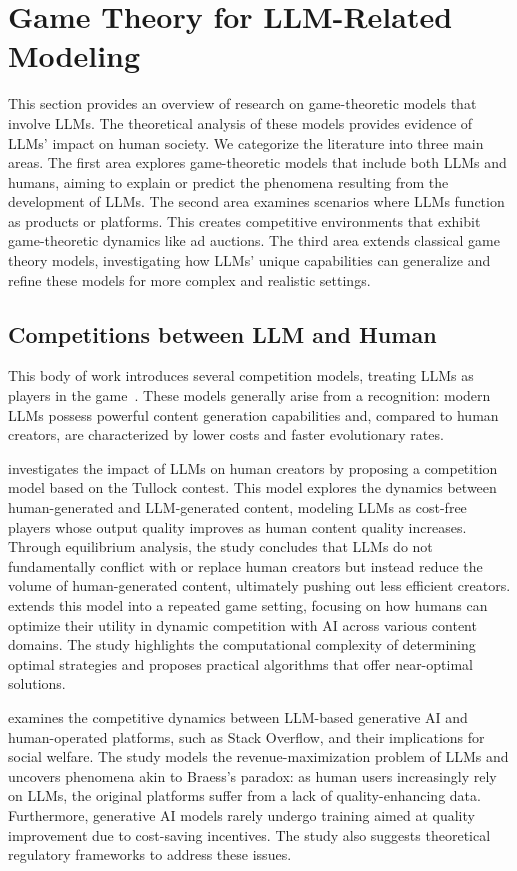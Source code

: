 \section{Game Theory for LLM-Related Modeling}\label{sec:llm_game_scenarios}
This section provides an overview of research on game-theoretic models that involve LLMs.
The theoretical analysis of these models provides evidence of LLMs' impact on human society. 
We categorize the literature into three main areas. 
The first area explores game-theoretic models that include both LLMs and humans, aiming to explain or predict the phenomena resulting from the development of LLMs. 
The second area examines scenarios where LLMs function as products or platforms.
This creates competitive environments that exhibit game-theoretic dynamics like ad auctions.
The third area extends classical game theory models, investigating how LLMs' unique capabilities can generalize and refine these models for more complex and realistic settings.


\subsection{Competitions between LLM and Human}\label{secsub:competition}
This body of work introduces several competition models, treating LLMs as players in the game~\cite{yaohuman,esmaeili2024strategize,taitler2024braess}. 
These models generally arise from a recognition: modern LLMs possess powerful content generation capabilities and, compared to human creators, are characterized by lower costs and faster evolutionary rates.

\cite{yaohuman} investigates the impact of LLMs on human creators by proposing a competition model based on the Tullock contest. This model explores the dynamics between human-generated and LLM-generated content, modeling LLMs as cost-free players whose output quality improves as human content quality increases. Through equilibrium analysis, the study concludes that LLMs do not fundamentally conflict with or replace human creators but instead reduce the volume of human-generated content, ultimately pushing out less efficient creators.
\cite{esmaeili2024strategize} extends this model into a repeated game setting, focusing on how humans can optimize their utility in dynamic competition with AI across various content domains. The study highlights the computational complexity of determining optimal strategies and proposes practical algorithms that offer near-optimal solutions.

\cite{taitler2024braess} examines the competitive dynamics between LLM-based generative AI and human-operated platforms, such as Stack Overflow, and their implications for social welfare. The study models the revenue-maximization problem of LLMs and uncovers phenomena akin to Braess's paradox: as human users increasingly rely on LLMs, the original platforms suffer from a lack of quality-enhancing data. Furthermore, generative AI models rarely undergo training aimed at quality improvement due to cost-saving incentives. The study also suggests theoretical regulatory frameworks to address these issues.

